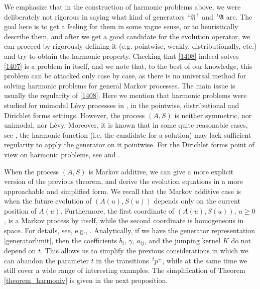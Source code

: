 \documentclass[reqno]{amsart}
\theoremstyle{remark}
\numberwithin{equation}{section} %
\newcommand{\1}{\mathds{1}}
\begin{document}
	We emphasize that in the construction of harmonic problems above, we were deliberately not rigorous in saying what kind of generators $\,^t\mathfrak{A}^+$ and $\,^t\mathfrak{A}$ are. The goal here is to get a feeling for them in some vague sense, or to heuristically describe them, and after we get a good candidate for the evolution operator, we can proceed by rigorously defining it (e.g. pointwise, weakly, distributionally, etc.) and try to obtain the harmonic property. Checking that \eqref{1408} indeed solves \eqref{1407} is a problem in itself, and we note that, to the best of our knowledge, this problem can be attacked only case by case, as there is no universal method for solving harmonic problems for general Markov processes. The main issue is usually the regularity of \eqref{1408}. Here we mention that harmonic problems were studied for unimodal L\'evy processes in \cite{bogdan_extension}, in the pointwise, distributional and Dirichlet forms settings. However, the process $(A,S)$ is neither symmetric, nor unimodal, nor L\'evy. Moreover, it is known that in some quite reasonable cases, see \cite[p. 150]{BS}, the harmonic function (i.e. the candidate for a solution) may lack sufficient regularity to apply the generator on it pointwise. For the Dirichlet forms point of view on harmonic problems, see  \cite{Chen09} and \cite{MZZ10}.
	
	
	
	When the process $(A, S)$ is Markov additive, we can give a more explicit version of the previous theorem, and derive the evolution equations in a more approachable and simplified form. We recall that the Markov additive case is when the future evolution of $(A(u),S(u))$ depends only on the current position of $A(u)$. Furthermore, the first coordinate of $(A(u),S(u))$, ${u\ge 0}$, is a Markov process by itself, while the second coordinate is homogeneous in space. For details, see, e.g., \cite{cinlarma}. Analytically, if we have the generator representation \eqref{generatorlimit}, then the coefficients $b_i$, $\gamma$, $a_{ij}$, and the jumping kernel $K$ do not depend on $t$. This allows us to simplify the previous considerations in which we can abandon the parameter $t$ in the transitions $\,^tp^{\pm}$, while at the same time we still cover a wide range of interesting examples.  The simplification of Theorem \ref{theorem_harmoniv} is given in the next proposition.
	
	
	
\end{document}
